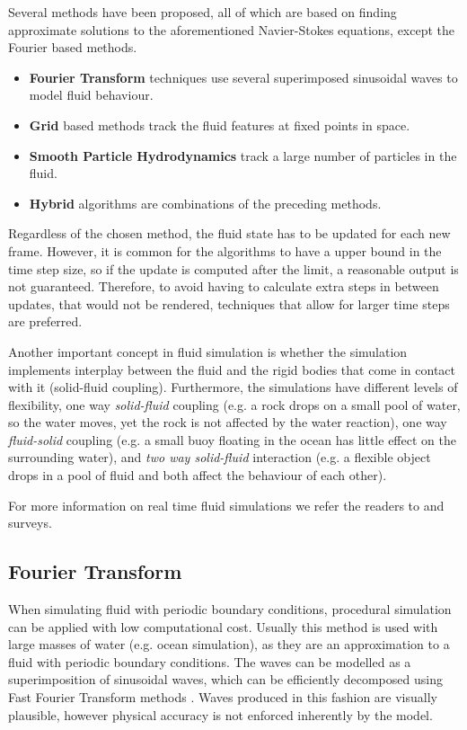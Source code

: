 Several methods have been proposed, all of which are based on finding approximate solutions to the aforementioned Navier-Stokes equations, except the Fourier based methods.

\begin{itemize}
\item \textbf{Fourier Transform} techniques use several superimposed sinusoidal waves to model fluid behaviour.
\item \textbf{Grid} based methods track the fluid features at fixed points in space.
\item \textbf{Smooth Particle Hydrodynamics} track a large number of particles in the fluid.
\item \textbf{Hybrid} algorithms are combinations of the preceding methods.
\end{itemize}

Regardless of the chosen method, the fluid state has to be updated for each new frame.
However, it is common for the algorithms to have a upper bound in the time step size, so if the update is computed after the limit, a reasonable output is not guaranteed.
Therefore, to avoid having to calculate extra steps in between updates, that would not be rendered, techniques that allow for larger time steps are preferred.  

Another important concept in fluid simulation is whether the simulation implements interplay between the fluid and the rigid bodies that come in contact with it (solid-fluid coupling).
Furthermore, the simulations have different levels of flexibility, one way \emph{solid-fluid} coupling (e.g. a rock drops on a small pool of water, so the water moves, yet the rock is not affected by the water reaction), one way \emph{fluid-solid} coupling (e.g. a small buoy floating in the ocean has little effect on the surrounding water), and \emph{two way solid-fluid} interaction (e.g. a flexible object drops in a pool of fluid and both affect the behaviour of each other).

For more information on real time fluid simulations we refer the readers to \cite{Vines2012} and \cite{Ihmsen2014} surveys.

\subsection{Fourier Transform}

When simulating fluid with periodic boundary conditions, procedural simulation can be applied with low computational cost.
Usually this method is used with large masses of water (e.g. ocean simulation), as they are an approximation to a fluid with periodic boundary conditions.
The waves can be modelled as a superimposition of sinusoidal waves, which can be efficiently decomposed using Fast Fourier Transform methods \cite{Mastin1987}.
Waves produced in this fashion are visually plausible, however physical accuracy is not enforced inherently by the model.

